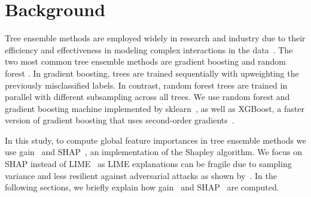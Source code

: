 \vspace{-.2cm}
\section{Background} \label{sec:background}
\vspace{-.2cm}
Tree ensemble methods are employed widely in research and industry due to their efficiency and effectiveness in modeling complex interactions in the data~\cite{biau2016random}. The two most common tree ensemble methods are gradient boosting \cite{friedman2002stochastic} and random forest \cite{breiman2001random}. In gradient boosting, trees are trained sequentially with upweighting the previously misclassified labels. In contrast, random forest trees are trained in parallel with different subsampling across all trees. We use random forest and gradient boosting machine implemented by sklearn~\cite{scikit-learn}, as well as XGBoost, a faster version of gradient boosting that uses second-order gradients~\cite{Chen:2016:XST:2939672.2939785}.

In this study, to compute global feature importances in tree ensemble methods we use gain~\cite{friedman2001elements} and SHAP~\cite{NIPS2017_7062}, an implementation of the Shapley algorithm. We focus on SHAP instead of LIME~\cite{ribeiro2016should} as LIME explanations can be fragile due to sampling variance \cite{bhatt2020explainable} and less resilient against adversarial attacks as shown by~\cite{slack2020fooling}. %
In the following sections, we briefly explain how gain~\cite{friedman2001elements} and SHAP~\cite{NIPS2017_7062} are computed.

